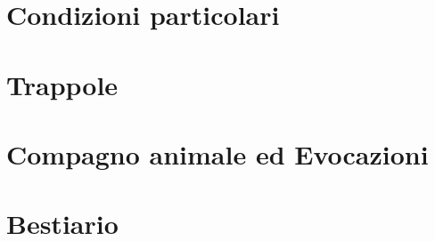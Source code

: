 \documentclass[10pt]{article} %
\begin{document}
\section{Condizioni particolari}

\clearpage

\section{Trappole}

\clearpage 

\section{Compagno animale ed Evocazioni}

\clearpage 

\section{Bestiario}

\clearpage 
\end{document}

